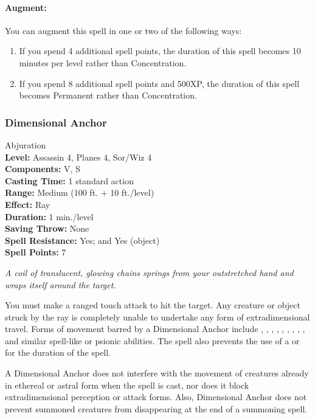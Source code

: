 \paragraph{Augment:} You can augment this spell in one or two of the following ways:
\begin{enumerate}
\item If you spend 4 additional spell points, the duration of this spell becomes 10 minutes per level rather than Concentration.
\item If you spend 8 additional spell points and 500XP, the duration of this spell becomes Permanent rather than Concentration.
\end{enumerate}
\subsubsection{Dimensional Anchor}
\label{Spell:DimensionalAnchor}
Abjuration
\\ \textbf{Level:} Assassin 4, Planes 4, Sor/Wiz 4
\\ \textbf{Components:} V, S
\\ \textbf{Casting Time:} 1 standard action
\\ \textbf{Range:} Medium (100 ft. + 10 ft./level)
\\ \textbf{Effect:} Ray
\\ \textbf{Duration:} 1 min./level
\\ \textbf{Saving Throw:} None
\\ \textbf{Spell Resistance:} Yes; and Yes (object)
\\ \textbf{Spell Points:} 7

\emph{A coil of translucent, glowing chains springs from your outstretched hand and wraps itself around the target.}

You must make a ranged touch attack to hit the target. 
Any creature or object struck by the ray is completely unable to undertake any form of extradimensional travel. 
Forms of movement barred by a Dimensional Anchor include , , , , , , , , , 
and similar spell-like or psionic abilities. 
The spell also prevents the use of a  or  for the duration of the spell.

A Dimensional Anchor does not interfere with the movement of creatures already in ethereal or astral form when the spell is cast, nor does it block extradimensional perception or attack forms.
Also, Dimensional Anchor does not prevent summoned creatures from disappearing at the end of a summoning spell.

